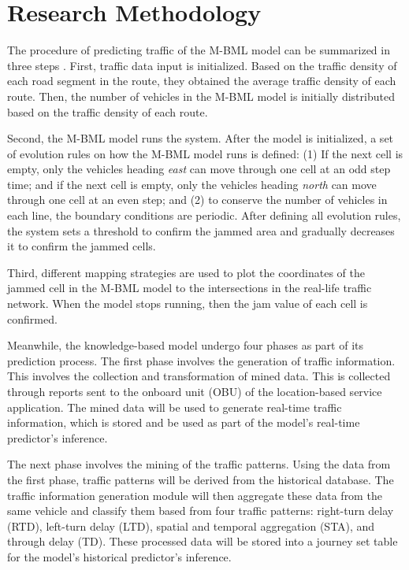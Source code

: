 \section{Research Methodology}
The procedure of predicting traffic of the M-BML model can be summarized in three steps . First, traffic data input is initialized. Based on the traffic density of each road segment in the route, they obtained the average traffic density of each route. Then, the number of vehicles in the M-BML model is initially distributed based on the traffic density of each route.

Second, the M-BML model runs the system. After the model is initialized, a set of evolution rules on how the M-BML model runs is defined: (1) If the next cell is empty, only the vehicles heading \textit{east} can move through one cell at an odd step time; and if the next cell is empty, only the vehicles heading \textit{north} can move through one cell at an even step; and (2) to conserve the number of vehicles in each line, the boundary conditions are periodic. After defining all evolution rules, the system sets a threshold to confirm the jammed area and gradually decreases it to confirm the jammed cells.

Third, different mapping strategies are used to plot the coordinates of the jammed cell in the M-BML model to the intersections in the real-life traffic network. When the model stops running, then the jam value of each cell is confirmed. 

Meanwhile, the knowledge-based model undergo four phases as part of its prediction process. The first phase involves the generation of traffic information. This involves the collection and transformation of mined data. This is collected through reports sent to the onboard unit (OBU) of the location-based service application. The mined data will be used to generate real-time traffic information, which is stored and be used as part of the model's real-time predictor's inference.

The next phase involves the mining of the traffic patterns. Using the data from the first phase, traffic patterns will be derived from the historical database. The traffic information generation module will then aggregate these data from the same vehicle and classify them based from four traffic patterns: right-turn delay (RTD), left-turn delay (LTD), spatial and temporal aggregation (STA), and through delay (TD). These processed data will be stored into a journey set table for the model's historical predictor's inference.

